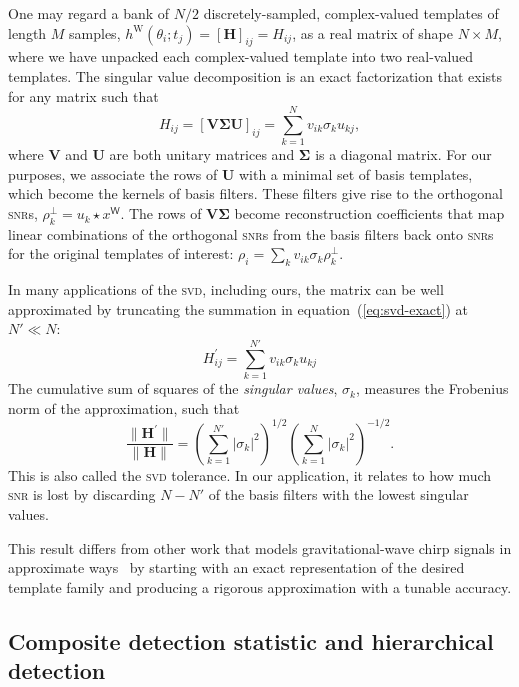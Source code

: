 One may regard a bank of $N/2$ discretely-sampled, complex-valued templates of
length $M$ samples, $h^\mathrm W(\theta_i; t_j) = [\mathbf H]_{ij} = H_{ij}$,
as a real matrix of shape $N \times M$, where we have unpacked each
complex-valued template into two real-valued templates.  The singular value
decomposition is an exact factorization that exists for any matrix such that
%
\begin{equation} \label{eq:svd-exact}
%
H_{ij} = [\mathbf {V \Sigma U}]_{ij} = \sum_{k=1}^{N} v_{ik} \sigma_k u_{kj},
%
\end{equation}
%
where $\mathbf V$ and $\mathbf U$ are both unitary matrices and $\mathbf
\Sigma$ is a diagonal matrix.  For our purposes, we associate the rows of
$\mathbf U$ with a minimal set of basis templates, which become the kernels of
basis filters.  These filters give rise to the orthogonal \textsc{snr}s,
$\rho_k^\perp = u_k \star x^\mathsf{W}$.  The rows of $\mathbf{V \Sigma}$
become reconstruction coefficients that map linear combinations of the
orthogonal \textsc{snr}s from the basis filters back onto \textsc{snr}s for the
original templates of interest: $\rho_i = \sum_k v_{ik} \sigma_k \rho_k^\perp$.

In many applications of the \textsc{svd}, including ours, the matrix can be
well approximated by truncating the summation in equation~(\ref{eq:svd-exact})
at $N' \ll N$:
%
\begin{equation}
%
H_{ij}^\prime = \sum_{k=1}^{N'} v_{ik} \sigma_k u_{kj}
%
\end{equation}
%
The cumulative sum of squares of the {\em singular values}, $\sigma_k$,
measures the Frobenius norm of the approximation, such that
%
\begin{equation}
%
\frac{\| \mathbf H^\prime \|}{\| \mathbf H \|} = \left(\sum_{k=1}^{N'}
|\sigma_k|^2\right)^{1/2} \left(\sum_{k=1}^{N} |\sigma_k|^2\right)^{-1/2}.
%
\end{equation}
%
This is also called the \textsc{svd} tolerance.  In our application, it relates
to how much \textsc{snr} is lost by discarding $N - N'$ of the basis filters
with the lowest singular values.

This result differs from other work that models gravitational-wave chirp
signals in approximate ways~\cite{Chassande-Mottin2006, Candes2008,
BuonannoChenVallisneri:2003a} by starting with an exact representation of the
desired template family and producing a rigorous approximation with a tunable
accuracy.

\subsection{Composite detection statistic and hierarchical detection}

